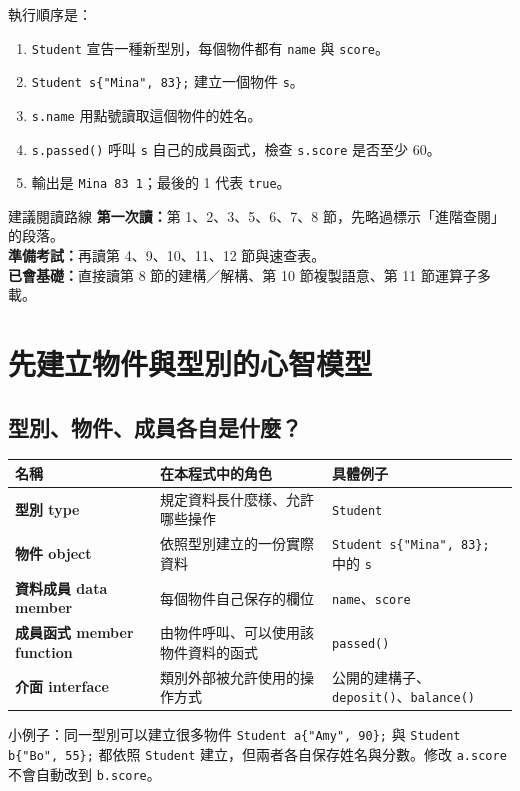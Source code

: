 \documentclass[11pt,a4paper]{article}
\newcommand{\code}[1]{\texttt{#1}}
\begin{document}
執行順序是：
\begin{enumerate}
  \item \code{Student} 宣告一種新型別，每個物件都有 \code{name} 與 \code{score}。
  \item \code{Student s\{"Mina", 83\};} 建立一個物件 \code{s}。
  \item \code{s.name} 用點號讀取這個物件的姓名。
  \item \code{s.passed()} 呼叫 \code{s} 自己的成員函式，檢查 \code{s.score} 是否至少 60。
  \item 輸出是 \code{Mina 83 1}；最後的 1 代表 \code{true}。
\end{enumerate}

\begin{skipbox}{建議閱讀路線}
\textbf{第一次讀：}第 1、2、3、5、6、7、8 節，先略過標示「進階查閱」的段落。\\
\textbf{準備考試：}再讀第 4、9、10、11、12 節與速查表。\\
\textbf{已會基礎：}直接讀第 8 節的建構／解構、第 10 節複製語意、第 11 節運算子多載。
\end{skipbox}

\section{先建立物件與型別的心智模型}

\subsection{型別、物件、成員各自是什麼？}

\begin{longtable}{>{\bfseries}p{28mm}p{47mm}p{73mm}}
\toprule
名稱 & 在本程式中的角色 & 具體例子 \\
\midrule
\endhead
型別 type & 規定資料長什麼樣、允許哪些操作 & \code{Student} \\
物件 object & 依照型別建立的一份實際資料 & \code{Student s\{"Mina", 83\};} 中的 \code{s} \\
資料成員 data member & 每個物件自己保存的欄位 & \code{name}、\code{score} \\
成員函式 member function & 由物件呼叫、可以使用該物件資料的函式 & \code{passed()} \\
介面 interface & 類別外部被允許使用的操作方式 & 公開的建構子、\code{deposit()}、\code{balance()} \\
\bottomrule
\end{longtable}

\begin{examplebox}{小例子：同一型別可以建立很多物件}
\code{Student a\{"Amy", 90\};} 與 \code{Student b\{"Bo", 55\};} 都依照 \code{Student} 建立，但兩者各自保存姓名與分數。修改 \code{a.score} 不會自動改到 \code{b.score}。
\end{examplebox}
\end{document}
